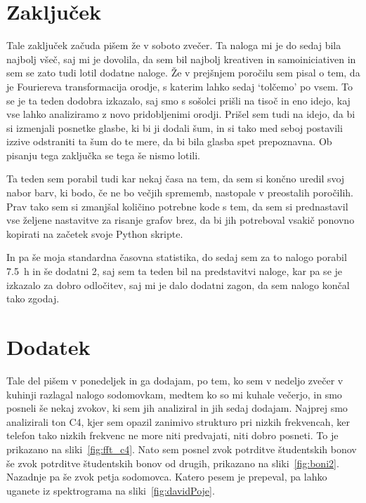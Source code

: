 \documentclass{porocilo}
\begin{document}
\section{Zaključek}
Tale zaključek začuda pišem že v soboto zvečer. Ta naloga mi je do sedaj bila najbolj všeč, saj mi je dovolila, da sem bil najbolj kreativen in samoiniciativen in sem se zato tudi lotil dodatne naloge. Že v prejšnjem poročilu sem pisal o tem, da je Fouriereva transformacija orodje, s katerim lahko sedaj `tolčemo' po vsem. To se je ta teden dodobra izkazalo, saj smo s sošolci prišli na tisoč in eno idejo, kaj vse lahko analiziramo z novo pridobljenimi orodji. Prišel sem tudi na idejo, da bi si izmenjali posnetke glasbe, ki bi ji dodali šum, in si tako med seboj postavili izzive odstraniti ta šum do te mere, da bi bila glasba spet prepoznavna. Ob pisanju tega zaključka se tega še nismo lotili.

Ta teden sem porabil tudi kar nekaj časa na tem, da sem si končno uredil svoj nabor barv, ki bodo, če ne bo večjih sprememb, nastopale v preostalih poročilih. Prav tako sem si zmanjšal količino potrebne kode s tem, da sem si prednastavil vse željene nastavitve za risanje grafov brez, da bi jih potreboval vsakič ponovno kopirati na začetek svoje Python skripte.

In pa še moja standardna časovna statistika, do sedaj sem za to nalogo porabil \SI{7.5}{\hour} in še dodatni 2, saj sem ta teden bil na predstavitvi naloge, kar pa se je izkazalo za dobro odločitev, saj mi je dalo dodatni zagon, da sem nalogo končal tako zgodaj.

\section{Dodatek}
Tale del pišem v ponedeljek in ga dodajam, po tem, ko sem v nedeljo zvečer v kuhinji razlagal nalogo sodomovkam, medtem ko so mi kuhale večerjo, in smo posneli še nekaj zvokov, ki sem jih analiziral in jih sedaj dodajam. Najprej smo analizirali ton C4, kjer sem opazil zanimivo strukturo pri nizkih frekvencah, ker telefon tako nizkih frekvenc ne more niti predvajati, niti dobro posneti. To je prikazano na sliki~\ref{fig:fft_c4}. Nato sem posnel zvok potrditve študentskih bonov še zvok potrditve študentskih bonov od drugih, prikazano na sliki~\ref{fig:boni2}. Nazadnje pa še zvok petja sodomovca. Katero pesem je prepeval, pa lahko uganete iz spektrograma na sliki~\ref{fig:davidPoje}.



\end{document}
